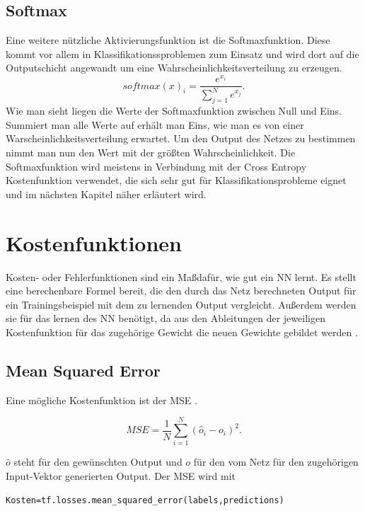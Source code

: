 \subsection{Softmax}\label{softmax}
Eine weitere nützliche Aktivierungsfunktion ist die Softmaxfunktion. Diese kommt vor allem in Klassifikationssproblemen zum Einsatz und wird dort auf die Outputschicht angewandt um eine Wahrscheinlichkeitsverteilung zu erzeugen.
\begin{equation}
softmax(x)_i=\frac{e^{x_i}}{\sum_{j=1}^{N}e^{x_j}}.
\end{equation}\cite{Goodfellow}
Wie man sieht liegen die Werte der Softmaxfunktion zwischen Null und Eins. Summiert man alle Werte auf erhält man Eins, wie man es von einer Warscheinlichkeitsverteilung erwartet. Um den Output des Netzes zu bestimmen nimmt man nun den Wert mit der größten Wahrscheinlichkeit.\cite{handson} Die Softmaxfunktion wird meistens in Verbindung mit der Cross Entropy Kostenfunktion verwendet, die sich sehr gut für Klassifikationsprobleme eignet und im nächsten Kapitel näher erläutert wird.

\section{Kostenfunktionen}
Kosten- oder Fehlerfunktionen sind ein Ma\ss daf\"ur, wie gut ein \gls{NN} lernt. Es stellt eine berechenbare Formel bereit, die den durch das Netz berechneten Output f\"ur ein Trainingsbeispiel mit dem zu lernenden Output vergleicht. Au\ss erdem werden sie f\"ur das lernen des \gls{NN} ben\"otigt, da aus den Ableitungen der jeweiligen Kostenfunktion f\"ur das zugeh\"orige Gewicht die neuen Gewichte gebildet werden \cite{Goodfellow}.


\subsection{Mean Squared Error}
Eine m\"ogliche Kostenfunktion ist der \gls{MSE} \cite{Rojas1996}.

\begin{equation}
MSE=\frac{1}{N}\sum_{i=1}^{N} (\hat{o}_i-o_i)^2.
\end{equation}

$\hat{o}$ steht f\"ur den gew\"unschten Output und $o$ f\"ur den vom Netz f\"ur den zugeh\"origen Input-Vektor generierten Output.
Der \gls{MSE} wird mit \cite{cookbook}

\vspace{0.3cm}
\begin{lstlisting}
Kosten=tf.losses.mean_squared_error(labels,predictions)
\end{lstlisting}

